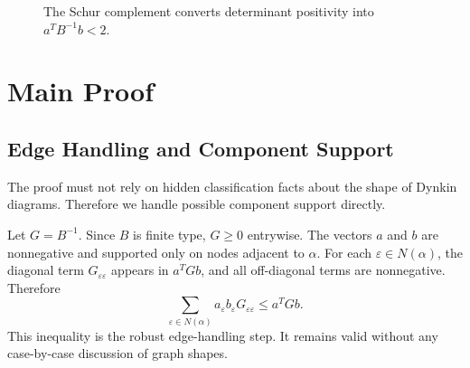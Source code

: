 \documentclass[11pt]{book}
\theoremstyle{definition}
\begin{document}
\begin{figure}[h]
\centering
{}
\caption{The Schur complement converts determinant positivity into $a^T B^{-1}b<2$.}
\end{figure}

\part{Main Proof}

\chapter{Edge Handling and Component Support}
The proof must not rely on hidden classification facts about the shape of Dynkin diagrams. Therefore we handle possible component support directly.

Let $G=B^{-1}$. Since $B$ is finite type, $G\ge0$ entrywise. The vectors $a$ and $b$ are nonnegative and supported only on nodes adjacent to $\alpha$. For each $\varepsilon\in N(\alpha)$, the diagonal term $G_{\varepsilon\varepsilon}$ appears in $a^TGb$, and all off-diagonal terms are nonnegative. Therefore
\[
 \boxed{\sum_{\varepsilon\in N(\alpha)}a_\varepsilon b_\varepsilon G_{\varepsilon\varepsilon}\le a^TGb.}
\]
This inequality is the robust edge-handling step. It remains valid without any case-by-case discussion of graph shapes.
\end{document}
